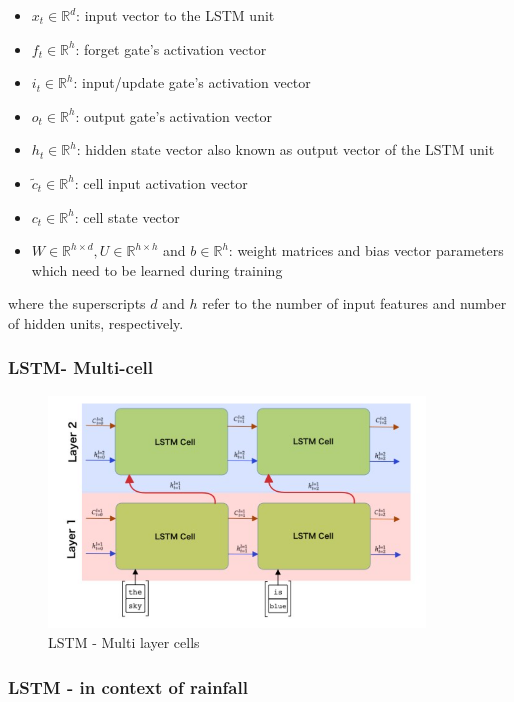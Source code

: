 \documentclass[12pt]{report}
\begin{document}
\begin{itemize}
	\item $x_t \in \mathbb{R}^{d}$: input vector to the LSTM unit 
	\item $f_t \in \mathbb{R}^{h}$: forget gate's activation vector
	\item $i_t \in \mathbb{R}^{h}$: input/update gate's activation vector 
	\item $o_t \in \mathbb{R}^{h}$: output gate's activation vector
	\item $h_t \in \mathbb{R}^{h}$: hidden state vector also known as output vector of the LSTM unit 
	\item $\tilde{c}_t \in \mathbb{R}^{h}$: cell input activation vector
	\item $c_t \in \mathbb{R}^{h}$: cell state vector
	\item $W \in \mathbb{R}^{h \times d}, U \in \mathbb{R}^{h \times h} $ and $b \in \mathbb{R}^{h}$: weight matrices and bias vector parameters which need to be learned during training
\end{itemize}

where the superscripts $d$ and $h$ refer to the number of input features and number of hidden units, respectively.


\subsubsection{LSTM- Multi-cell}

\begin{figure}[H]\centering\includegraphics[width=10cm]{LSTM_MULTI.png}\caption{LSTM - Multi layer cells}\end{figure}
\subsubsection{LSTM - in context of rainfall}
\end{document}
